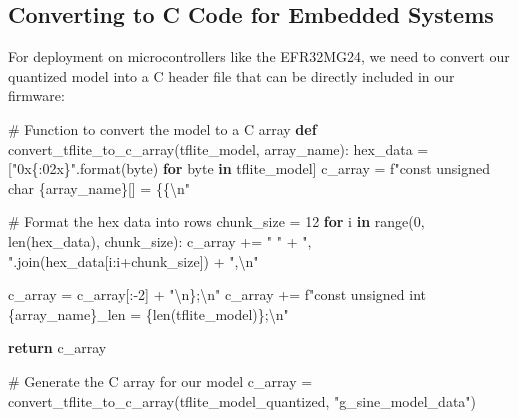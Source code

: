 \documentclass[
  9pt,
  letterpaper,
  abstract,
  titlepage]{scrbook}
\newenvironment{Shaded}{\begin{snugshade}}{\end{snugshade}}
\newcommand{\BuiltInTok}[1]{\textcolor[rgb]{0.00,0.23,0.31}{#1}}
\newcommand{\CharTok}[1]{\textcolor[rgb]{0.13,0.47,0.30}{#1}}
\newcommand{\CommentTok}[1]{\textcolor[rgb]{0.37,0.37,0.37}{#1}}
\newcommand{\ControlFlowTok}[1]{\textcolor[rgb]{0.00,0.23,0.31}{\textbf{#1}}}
\newcommand{\DecValTok}[1]{\textcolor[rgb]{0.68,0.00,0.00}{#1}}
\newcommand{\KeywordTok}[1]{\textcolor[rgb]{0.00,0.23,0.31}{\textbf{#1}}}
\newcommand{\NormalTok}[1]{\textcolor[rgb]{0.00,0.23,0.31}{#1}}
\newcommand{\OperatorTok}[1]{\textcolor[rgb]{0.37,0.37,0.37}{#1}}
\newcommand{\SpecialCharTok}[1]{\textcolor[rgb]{0.37,0.37,0.37}{#1}}
\newcommand{\SpecialStringTok}[1]{\textcolor[rgb]{0.13,0.47,0.30}{#1}}
\newcommand{\StringTok}[1]{\textcolor[rgb]{0.13,0.47,0.30}{#1}}
\begin{document}
\subsection{Converting to C Code for Embedded
Systems}\label{converting-to-c-code-for-embedded-systems}

For deployment on microcontrollers like the EFR32MG24, we need to
convert our quantized model into a C header file that can be directly
included in our firmware:

\begin{Shaded}
\begin{Highlighting}[]
\CommentTok{\# Function to convert the model to a C array}
\KeywordTok{def}\NormalTok{ convert\_tflite\_to\_c\_array(tflite\_model, array\_name):}
\NormalTok{    hex\_data }\OperatorTok{=}\NormalTok{ [}\StringTok{"0x}\SpecialCharTok{\{:02x\}}\StringTok{"}\NormalTok{.}\BuiltInTok{format}\NormalTok{(byte) }\ControlFlowTok{for}\NormalTok{ byte }\KeywordTok{in}\NormalTok{ tflite\_model]}
\NormalTok{    c\_array }\OperatorTok{=} \SpecialStringTok{f"const unsigned char }\SpecialCharTok{\{}\NormalTok{array\_name}\SpecialCharTok{\}}\SpecialStringTok{[] = }\CharTok{\{\{\textbackslash{}n}\SpecialStringTok{"}
    
    \CommentTok{\# Format the hex data into rows}
\NormalTok{    chunk\_size }\OperatorTok{=} \DecValTok{12}
    \ControlFlowTok{for}\NormalTok{ i }\KeywordTok{in} \BuiltInTok{range}\NormalTok{(}\DecValTok{0}\NormalTok{, }\BuiltInTok{len}\NormalTok{(hex\_data), chunk\_size):}
\NormalTok{        c\_array }\OperatorTok{+=} \StringTok{"  "} \OperatorTok{+} \StringTok{", "}\NormalTok{.join(hex\_data[i:i}\OperatorTok{+}\NormalTok{chunk\_size]) }\OperatorTok{+} \StringTok{",}\CharTok{\textbackslash{}n}\StringTok{"}
    
\NormalTok{    c\_array }\OperatorTok{=}\NormalTok{ c\_array[:}\OperatorTok{{-}}\DecValTok{2}\NormalTok{] }\OperatorTok{+} \StringTok{"}\CharTok{\textbackslash{}n}\StringTok{\};}\CharTok{\textbackslash{}n}\StringTok{"}
\NormalTok{    c\_array }\OperatorTok{+=} \SpecialStringTok{f"const unsigned int }\SpecialCharTok{\{}\NormalTok{array\_name}\SpecialCharTok{\}}\SpecialStringTok{\_len = }\SpecialCharTok{\{}\BuiltInTok{len}\NormalTok{(tflite\_model)}\SpecialCharTok{\}}\SpecialStringTok{;}\CharTok{\textbackslash{}n}\SpecialStringTok{"}
    
    \ControlFlowTok{return}\NormalTok{ c\_array}

\CommentTok{\# Generate the C array for our model}
\NormalTok{c\_array }\OperatorTok{=}\NormalTok{ convert\_tflite\_to\_c\_array(tflite\_model\_quantized, }\StringTok{"g\_sine\_model\_data"}\NormalTok{)}


\end{Highlighting}
\end{Shaded}
\end{document}
